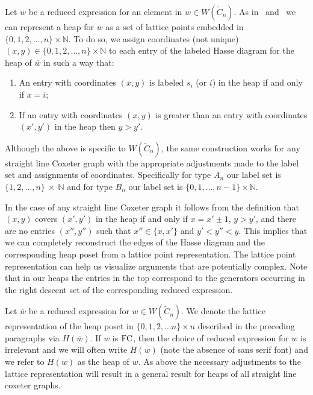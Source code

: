 Let $\overline{w}$ be a reduced expression for an element in $w \in W(\widetilde{C}_n)$. As in~\cite{Billey2007} and~\cite{Ernst2010} we can represent a heap for $\overline{w}$ as a set of lattice points embedded in $\{0,1,2,\ldots, n\} \times \mathbb{N}$. To do so, we assign coordinates (not unique) $(x,y) \in \{0,1,2,\ldots, n\} \times \mathbb{N}$ to each entry of the labeled Hasse diagram for the heap of $\overline{w}$ in such a way that:
\begin{enumerate}
\item An entry with coordinates $(x,y)$ is labeled $s_i$ (or $i$) in the heap if and only if $x = i$; 

\item If an entry with coordinates $(x,y)$ is greater than an entry with coordinates $(x',y')$ in the heap then $y > y'$.
\end{enumerate}

Although the above is specific to $W(\widetilde{C}_n)$, the same construction works for any straight line Coxeter graph with the appropriate adjustments made to the label set and assignments of coordinates. Specifically for type $A_n$ our label set is $\{1,2, \ldots, n\}~\times~\mathbb{N}$ and for type $B_n$ our label set is $\{0,1, \ldots, n-1\} \times \mathbb{N}$.

In the case of any straight line Coxeter graph it follows from the definition that $(x,y)$ covers $(x',y')$ in the heap if and only if $x = x' \pm 1$, $y > y'$, and there are no entries $(x'', y'')$ such that $x'' \in \{x, x'\}$ and $y'< y'' < y$. This implies that we can completely reconstruct the edges of the Hasse diagram and the corresponding heap poset from a lattice point representation. The lattice point representation can help us visualize arguments that are potentially complex. Note that in our heaps the entries in the top correspond to the generators occurring in the right descent set of the corresponding reduced expression.

Let $\overline{w}$ be a reduced expression for $w \in W(\widetilde{C}_n)$. We denote the lattice representation of the heap poset in $\{0,1,2, \ldots n\} \times n$ described in the preceding paragraphs via $H(\overline{w})$. If $w$ is $\mathrm{FC}$, then the choice of reduced expression for $w$ is irrelevant and we will often write $H(w)$ (note the absence of \textsf{sans serif} font) and we refer to $H(w)$ as the heap of $w$. As above the necessary adjustments to the lattice representation will result in a general result for heaps of all straight line coxeter graphs.

